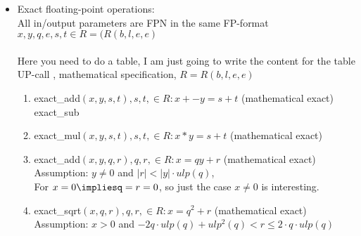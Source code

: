 \documentclass[a4paper, 11pt]{report}
\theoremstyle{break}
\theoremstyle{proofstyle}
\begin{document}
    \begin{itemize}
        \item Exact floating-point operations: \\
        All in/output parameters are FPN in the same FP-format $x,y,q,e,s,t\in R=(R(b,l,e,e)$ \\
        \\
        Here you need to do a table, I am just going to write the content for the table 
        \\
        UP-call , mathematical specification, $R=R(b,l,e,e)$ 
        \begin{enumerate}
            \item exact_add$(x,y,s,t), s,t,\in R: x+- y=s+t$ (mathematical exact) \\
            exact_sub
            \item exact_mul$(x,y,s,t), s,t,\in R: x*y=s+t$ (mathematical exact) 
            \item exact_add$(x,y,q,r), q,r,\in R: x=qy+r$ (mathematical exact) \\
            Assumption: $y\not=0$ and $|r|<|y|\cdot ulp(q)$, \\
            For $x=0 \impliesq=r=0$, so just the case $x\not=0 $ is interesting.\\
            
            \item exact_sqrt$(x,q,r), q,r,\in R: x=q^2+r$ (mathematical exact) \\
            Assumption: $x>0$ and $-2q\cdot ulp(q)+ulp^2(q)<r\leqslant 2\cdot q\cdot ulp(q)$ \\
        \end{enumerate}
    \end{itemize} \bigskip
    
\end{document}
